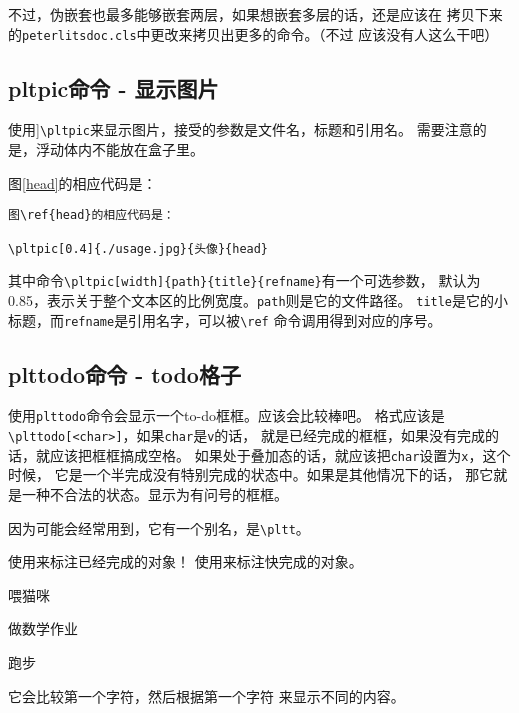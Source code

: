 \documentclass{peterlitsdoc}
\newcommand{\vb}{\verb}
\begin{document}
不过，伪嵌套也最多能够嵌套两层，如果想嵌套多层的话，还是应该在
拷贝下来的\vb|peterlitsdoc.cls|中更改来拷贝出更多的命令。（不过
应该没有人这么干吧）


\subsection{pltpic命令 - 显示图片}

使用]\vb|\pltpic|来显示图片，接受的参数是文件名，标题和引用名。
需要注意的是，浮动体内不能放在盒子里。

图\ref{head}的相应代码是：

\begin{lstlisting}
图\ref{head}的相应代码是：

\pltpic[0.4]{./usage.jpg}{头像}{head}
\end{lstlisting}


其中命令\vb|\pltpic[width]{path}{title}{refname}|有一个可选参数，
默认为0.85，表示关于整个文本区的比例宽度。\vb|path|则是它的文件路径。
\vb|title|是它的小标题，而\vb|refname|是引用名字，可以被\vb|\ref|
命令调用得到对应的序号。



\subsection{plttodo命令 - todo格子}

使用\vb|plttodo|命令会显示一个to-do框框。应该会比较棒吧。
格式应该是\vb|\plttodo[<char>]|，如果\vb|char|是\vb|v|的话，
就是已经完成的框框，如果没有完成的话，就应该把框框搞成空格。
如果处于叠加态的话，就应该把\vb|char|设置为\vb|x|，这个时候，
它是一个半完成没有特别完成的状态中。如果是其他情况下的话，
那它就是一种不合法的状态。显示为有问号的框框。

因为可能会经常用到，它有一个别名，是\vb|\pltt|。

\begin{pltrun}
使用\plttodo[v]来标注已经完成的对象！
使用\plttodo[x]来标注快完成的对象。

\plttodo[v]喂猫咪

\plttodo[x]做数学作业

\plttodo[ ]跑步

它会比较第一个字符，然后根据第一个字符
来显示不同的内容。

\pltt[]   \pltt[x]  \pltt[  ] \pltt[ ]
\pltt[aa] \pltt[ a] \pltt[v]  \pltt[vv]
\pltt[ v]
\end{pltrun}
\end{document}
